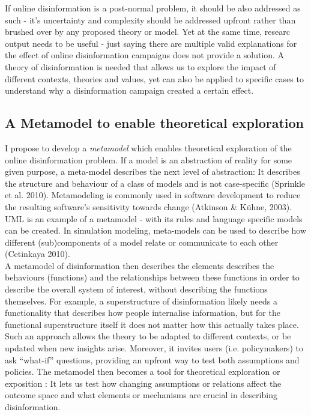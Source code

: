  If online disinformation is a post-normal problem, it should be also addressed as such - it's uncertainty and complexity should be addressed upfront rather than brushed over by any proposed theory or model. Yet at the same time, researc output needs to be useful - just saying there are multiple valid explanations for the effect of online disinformation campaigns does not provide a solution. A theory of disinformation is needed that allows us to explore the impact of different contexts, theories and values, yet can also be applied to specific cases to understand why a disinformation campaign created a certain effect.

\subsection{A Metamodel to enable theoretical exploration}
I propose to develop a \textit{metamodel} which enables theoretical exploration of the online disinformation problem. If a model is an abstraction of reality for some given purpose, a meta-model describes the next level of abstraction: It describes the structure and behaviour of a class of models and is not case-specific (Sprinkle et al. 2010). Metamodeling is commonly used in software development to reduce the resulting software's sensitivity towards change (Atkinson \& Kühne, 2003). UML is an example of a metamodel - with its rules and language specific models can be created. In simulation modeling, meta-models can be used to describe how different (sub)components of a model relate or communicate to each other (Cetinkaya 2010). \\

A metamodel of disinformation then describes the elements describes the behaviours (functions) and the relationships between these functions in order to describe the overall system of interest, without describing the functions themselves. For example, a superstructure of disinformation likely needs a functionality that describes how people internalise information, but for the functional superstructure itself it does not matter how this actually takes place. Such an approach allows the theory to be adapted to different contexts, or be updated when new insights arise. Moreover, it invites users (i.e. policymakers) to ask “what-if” questions, providing an upfront way to test both assumptions and policies. The metamodel then becomes a tool for theoretical exploration or exposition \cite{Edmonds2017}: It lets us test how changing assumptions or relations affect the outcome space and what elements or mechanisms are crucial in describing disinformation.


